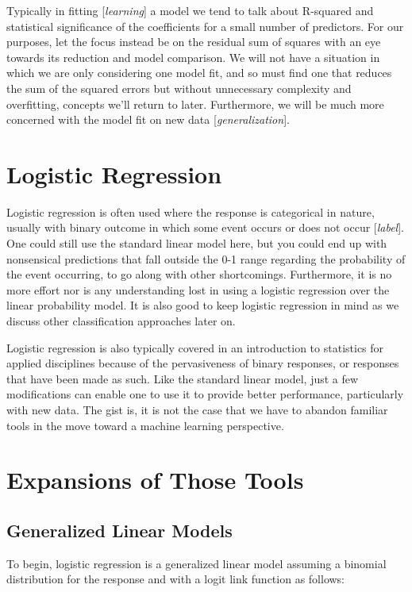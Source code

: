 \documentclass[english,nohyper,titlepage]{tufte-handout}
\begin{document}
Typically in fitting [\emph{learning}] a model we tend to talk about R-squared and statistical significance of the coefficients for a small number of predictors.  For our purposes, let the focus instead be on the residual sum of squares with an eye towards its reduction and model comparison. We will not have a situation in which we are only considering one model fit, and so must find one that reduces the sum of the squared errors but without unnecessary complexity and overfitting, concepts we'll return to later.  Furthermore, we will be much more concerned with the model fit on new data [\emph{generalization}].

\section{Logistic Regression}
Logistic regression is often used where the response is categorical in nature, usually with binary outcome in which some event occurs or does not occur [\emph{label}].  One could still use the standard linear model here, but you could end up with nonsensical predictions that fall outside the 0-1 range regarding the probability of the event occurring, to go along with other shortcomings.  Furthermore, it is no more effort nor is any understanding lost in using a logistic regression over the linear probability model.  It is also good to keep logistic regression in mind as we discuss other classification approaches later on.

Logistic regression is also typically covered in an introduction to statistics for applied disciplines because of the pervasiveness of binary responses, or responses that have been made as such.  Like the standard linear model, just a few modifications can enable one to use it to provide better performance, particularly with new data.  The gist is, it is not the case that we have to abandon familiar tools in the move toward a machine learning perspective.


\section{Expansions of Those Tools}

\subsection{Generalized Linear Models}
To begin, logistic regression is a generalized linear model assuming a binomial distribution for the response and with a logit link function as follows:
\end{document}
